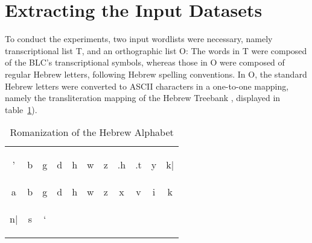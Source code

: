 \section{Extracting the Input Datasets}\label{sec:extr}
To conduct the experiments, two input wordlists were necessary, 
namely transcriptional list T, and an orthographic list O:
The words in T were composed of the \ac{BLC}'s transcriptional symbols, 
whereas those in O
were composed of regular Hebrew letters, following Hebrew spelling conventions. 
In O, the standard Hebrew letters were converted to ASCII characters in a one-to-one
mapping, namely the transliteration mapping of the Hebrew Treebank 
\citep{simaan-et-al:2001}, displayed in table~\ref{tab:ortho-alph}). %
\begin{table}[ht]
\centering
\caption{Romanization of the Hebrew Alphabet \citep{simaan-et-al:2001}}
\label{tab:ortho-alph}
\begin{tabular}{c c c c c c c c c c c}
\hline %
\begin{cjhebrew}'\end{cjhebrew} & \begin{cjhebrew}b\end{cjhebrew} & \begin{cjhebrew}g\end{cjhebrew} & \begin{cjhebrew}d\end{cjhebrew} 
& \begin{cjhebrew}h\end{cjhebrew} & \begin{cjhebrew}w\end{cjhebrew} & \begin{cjhebrew}z\end{cjhebrew}& \begin{cjhebrew}.h\end{cjhebrew}
& \begin{cjhebrew}.t\end{cjhebrew} & \begin{cjhebrew}y\end{cjhebrew} & \begin{cjhebrew}k|\end{cjhebrew} \\ 
a & b & g & d 
& h & w & z & x & v & i & k \\[12pt]
           \begin{cjhebrew}n|\end{cjhebrew} & \begin{cjhebrew}s\end{cjhebrew} & \begin{cjhebrew}`\end{cjhebrew} 

\end{tabular}
\end{table}
